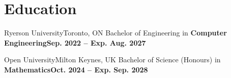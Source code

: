 

\section{Education}
  \resumeSubHeadingListStart
    \resumeSubheading
      {Ryerson University}{Toronto, ON}
      {Bachelor of Engineering in \textbf{Computer Engineering}}{\textbf{Sep. 2022 -- Exp. Aug. 2027}}
      
      \vspace{0.05cm}
      
      
    
    
    \resumeSubheading
      {Open University}{Milton Keynes, UK}
      {Bachelor of Science (Honours) in \textbf{Mathematics}}{\textbf{Oct. 2024 -- Exp. Sep. 2028}}
      
      \vspace{0.05cm}
      
      
      

    \spaceReducerMini
    
  \resumeSubHeadingListEnd

